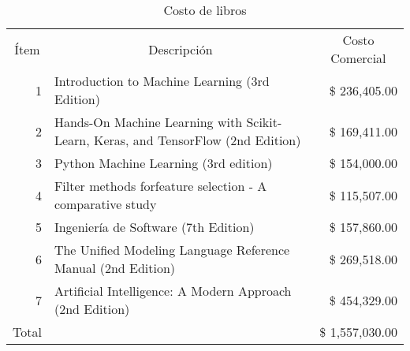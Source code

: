 \begin{table}[H]
    \centering
    \caption{Costo de libros}
    \footnotesize
    \begin{tabular}{crr}
        \hline
        Ítem & \multicolumn{1}{c}{Descripción} & \multicolumn{1}{c}{Costo Comercial} \bigstrut\\
    \cline{2-3}    \multicolumn{1}{r}{1} & \multicolumn{1}{l}{Introduction to Machine Learning (3rd Edition)} &  \$      236,405.00  \bigstrut[t]\\
        \multicolumn{1}{r}{2} & \multicolumn{1}{l}{Hands-On Machine Learning with Scikit-Learn, Keras, and TensorFlow (2nd Edition)} &  \$      169,411.00  \\
        \multicolumn{1}{r}{3} & \multicolumn{1}{l}{Python Machine Learning (3rd edition)} &  \$      154,000.00  \\
        \multicolumn{1}{r}{4} & \multicolumn{1}{l}{Filter methods forfeature selection - A comparative study} &  \$      115,507.00  \\
        \multicolumn{1}{r}{5} & \multicolumn{1}{l}{Ingeniería de Software (7th Edition)} &  \$      157,860.00  \\
        \multicolumn{1}{r}{6} & \multicolumn{1}{l}{The Unified Modeling Language Reference Manual (2nd Edition)} &  \$      269,518.00  \\
        \multicolumn{1}{r}{7} & \multicolumn{1}{l}{Artificial Intelligence: A Modern Approach (2nd Edition)} &  \$      454,329.00  \bigstrut[b]\\
    \cline{2-3}    Total &   &  \$   1,557,030.00  \bigstrut\\
        \hline
    \end{tabular}%
  \label{tab:libros}%
\end{table}%

